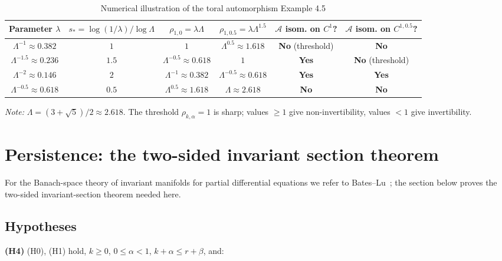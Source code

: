 \documentclass[11pt,a4paper]{article}
\theoremstyle{plain}
\theoremstyle{definition}
\theoremstyle{remark}
\numberwithin{equation}{section}
\numberwithin{figure}{section}
\begin{document}
\begin{table}[h]
\centering
\begin{tabular}{c|c|c|c|c|c}
\toprule
Parameter $\lambda$ & $s_*=\log(1/\lambda)/\log\Lambda$ & $\rho_{1,0}=\lambda\Lambda$ & $\rho_{1,0.5}=\lambda\Lambda^{1.5}$ & $\mathcal A$ isom. on $C^1$? & $\mathcal A$ isom. on $C^{1,0.5}$? \\
\midrule
$\Lambda^{-1}\approx 0.382$ & $1$ & $1$ & $\Lambda^{0.5}\approx 1.618$ & \textbf{No} (threshold) & \textbf{No} \\
$\Lambda^{-1.5}\approx 0.236$ & $1.5$ & $\Lambda^{-0.5}\approx 0.618$ & $1$ & \textbf{Yes} & \textbf{No} (threshold) \\
$\Lambda^{-2}\approx 0.146$ & $2$ & $\Lambda^{-1}\approx 0.382$ & $\Lambda^{-0.5}\approx 0.618$ & \textbf{Yes} & \textbf{Yes} \\
$\Lambda^{-0.5}\approx 0.618$ & $0.5$ & $\Lambda^{0.5}\approx 1.618$ & $\Lambda\approx 2.618$ & \textbf{No} & \textbf{No} \\
\bottomrule
\end{tabular}
\caption{Numerical illustration of the toral automorphism Example 4.5}
\label{tab:table45}
\end{table}

\textit{Note:} $\Lambda=(3+\sqrt5)/2\approx 2.618$. The threshold $\rho_{k,\alpha}=1$ is sharp; values $\ge1$ give non-invertibility, values $<1$ give invertibility.

\section{Persistence: the two-sided invariant section theorem}

For the Banach-space theory of invariant manifolds for partial differential equations we refer to Bates–Lu~\cite{bates1995}; the section below proves the two-sided invariant-section theorem needed here.

\subsection{Hypotheses}

\textbf{(H4)} (H0), (H1) hold, $k\ge0$, $0\le\alpha<1$, $k+\alpha\le r+\beta$, and:
\end{document}
